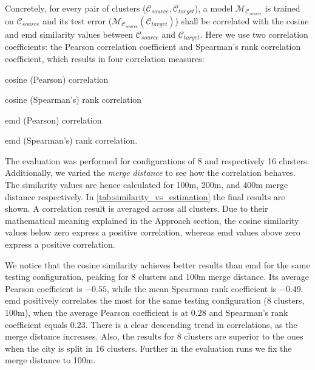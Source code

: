 \documentclass{ws-ijait}
\newcommand{\cmmnt}[1]{\ignorespaces}
\begin{document}
		Concretely, for every pair of clusters ($\mathcal{C}_{source}, \mathcal{C}_{target}$), a model $\mathcal{M}_{\mathcal{C}_{source}}$ is trained on $\mathcal{C}_{source}$ and its test error ($\mathcal{M}_{\mathcal{C}_{source}}(\mathcal{C}_{target})$) shall be correlated with the cosine and emd similarity values between $\mathcal{C}_{source}$ and $\mathcal{C}_{target}$. Here we use two correlation coefficients: the Pearson correlation coefficient and Spearman's rank correlation coefficient, which results in four correlation measures: 
		\begin{romanlist}
			\item	cosine (Pearson) correlation
			\item 	cosine (Spearman's) rank correlation
			\item 	emd (Pearson) correlation
			\item 	emd (Spearman's) rank correlation. 
		\end{romanlist}
		The evaluation was performed for configurations of 8 and respectively 16 clusters. Additionally, we varied the \textit{merge distance} to see how the correlation behaves. The similarity values are hence calculated for 100m, 200m, and 400m merge distance respectively. In \cref{tab:similarity_vs_estimation} the final results are shown. A correlation result is averaged across all clusters. Due to their mathematical meaning explained in \cmmnt{\cref{realization:similarity_functions}} the Approach section, the cosine similarity values below zero express a positive correlation, whereas emd values above zero express a positive correlation. 
		
		We notice that the cosine similarity achieves better results than emd for the same testing configuration, peaking for 8 clusters and 100m merge distance. Its average Pearson coefficient is $-0.55$, while the mean Spearman rank coefficient is $-0.49$. emd positively correlates the most for the same testing configuration (8 clusters, 100m), when the average Pearson coefficient is at $0.28$ and Spearman's rank coefficient equals $0.23$. There is a clear descending trend in correlations, as the merge distance increases.  Also, the results for 8 clusters are superior to the ones when the city is split in 16 clusters. Further in the evaluation runs we fix the merge distance to 100m.
		
\end{document}
